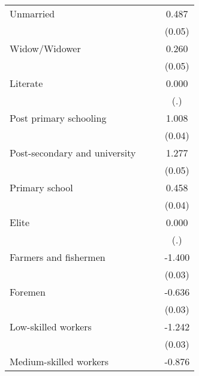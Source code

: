 {\begin{tabular}{l*{3}{c}}
Unmarried           &                     &                     &       0.487\sym{***}\\
                    &                     &                     &      (0.05)         \\
Widow/Widower       &                     &                     &       0.260\sym{***}\\
                    &                     &                     &      (0.05)         \\
Literate            &                     &                     &       0.000         \\
                    &                     &                     &         (.)         \\
Post primary schooling&                     &                     &       1.008\sym{***}\\
                    &                     &                     &      (0.04)         \\
Post-secondary and university&                     &                     &       1.277\sym{***}\\
                    &                     &                     &      (0.05)         \\
Primary school      &                     &                     &       0.458\sym{***}\\
                    &                     &                     &      (0.04)         \\
Elite               &                     &                     &       0.000         \\
                    &                     &                     &         (.)         \\
Farmers and fishermen&                     &                     &      -1.400\sym{***}\\
                    &                     &                     &      (0.03)         \\
Foremen             &                     &                     &      -0.636\sym{***}\\
                    &                     &                     &      (0.03)         \\
Low-skilled workers &                     &                     &      -1.242\sym{***}\\
                    &                     &                     &      (0.03)         \\
Medium-skilled workers&                     &                     &      -0.876\sym{***}\\

\end{tabular}}
